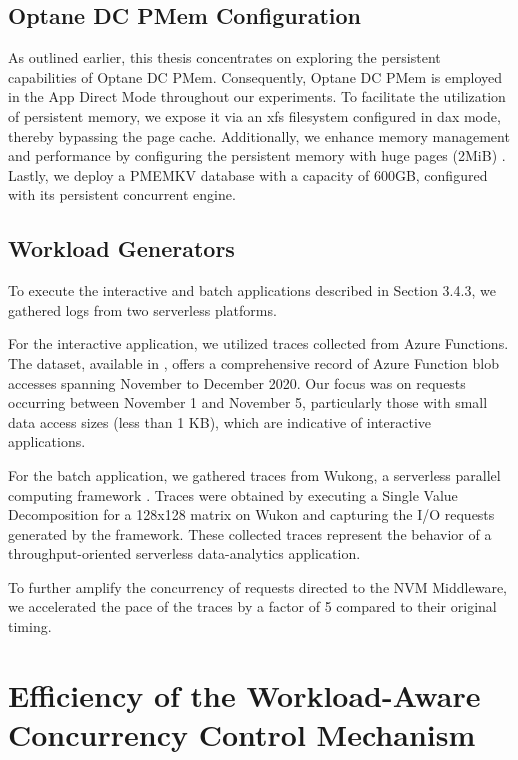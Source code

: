 \subsection{Optane DC PMem Configuration}
As outlined earlier, this thesis concentrates on exploring the persistent capabilities of Optane DC PMem. Consequently, Optane DC PMem is employed in the App Direct Mode throughout our experiments. To facilitate the utilization of persistent memory, we expose it via an xfs filesystem configured in dax mode, thereby bypassing the page cache. Additionally, we enhance memory management and performance by configuring the persistent memory with huge pages (2MiB) \cite{Speeding28:online}. Lastly, we deploy a PMEMKV database with a capacity of 600GB, configured with its persistent concurrent engine.

\subsection{Workload Generators}

To execute the interactive and batch applications described in Section 3.4.3, we gathered logs from two serverless platforms.

For the interactive application, we utilized traces collected from Azure Functions. The dataset, available in \cite{GitHubAz35:online}, offers a comprehensive record of Azure Function blob accesses spanning November to December 2020. Our focus was on requests occurring between November 1 and November 5, particularly those with small data access sizes (less than 1 KB), which are indicative of interactive applications.

For the batch application, we gathered traces from Wukong, a serverless parallel computing framework \cite{carver2020wukong}. Traces were obtained by executing a Single Value Decomposition for a 128x128 matrix on Wukon and capturing the I/O requests generated by the framework. These collected traces represent the behavior of a throughput-oriented serverless data-analytics application.

To further amplify the concurrency of requests directed to the NVM Middleware, we accelerated the pace of the traces by a factor of 5 compared to their original timing.

\section{Efficiency of the Workload-Aware Concurrency Control Mechanism}

